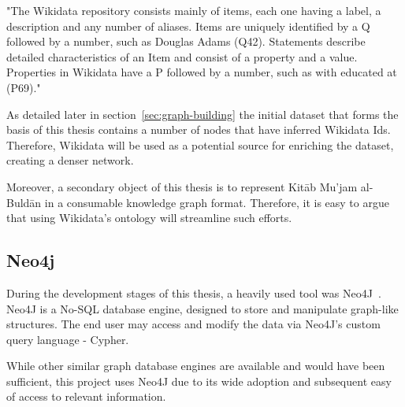 "The Wikidata repository consists mainly of items, each one having a label, a description and any number of aliases.
Items are uniquely identified by a Q followed by a number, such as Douglas Adams (Q42).
Statements describe detailed characteristics of an Item and consist of a property and a value.
Properties in Wikidata have a P followed by a number, such as with educated at (P69)."~\cite{Wikidata}

As detailed later in section~\ref{sec:graph-building} the initial dataset that forms the basis of this thesis contains a number of nodes that have inferred Wikidata Ids.
Therefore, Wikidata will be used as a potential source for enriching the dataset, creating a denser network.

Moreover, a secondary object of this thesis is to represent Kitāb Mu'jam al-Buldān in a consumable knowledge graph format.
Therefore, it is easy to argue that using Wikidata's ontology will streamline such efforts.

\subsection{Neo4j}\label{subsec:introduction-neo4j}
During the development stages of this thesis, a heavily used tool was Neo4J~\cite{Neo4j}.
Neo4J is a No-SQL database engine, designed to store and manipulate graph-like structures.
The end user may access and modify the data via Neo4J's custom query language - Cypher.

While other similar graph database engines are available and would have been sufficient, this project uses Neo4J
due to its wide adoption and subsequent easy of access to relevant information.
